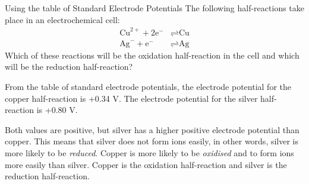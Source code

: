 \begin{wex}{Using the table of Standard Electrode Potentials}
{The following half-reactions take place in an electrochemical cell:
  \begin{align*}
    \text{Cu}^{2+} + 2\text{e}^{-} &\rightleftharpoons \text{Cu} \\
    \text{Ag}^{-} + \text{e}^{-} &\rightleftharpoons \text{Ag}
  \end{align*}
  Which of these reactions will be the oxidation half-reaction in the
  cell and which will be the reduction half-reaction?
}
{
From the table of standard electrode potentials, the electrode potential for the copper half-reaction is +0.34 V. The electrode potential for the silver half-reaction is +0.80 V.

Both values are positive, but silver has a higher positive electrode potential than copper. This means that silver does not form ions easily, in other words, silver is more likely to be \textit{reduced}. Copper is more likely to be \textit{oxidised} and to form ions more easily than silver. Copper is the oxidation half-reaction and silver is the reduction half-reaction.
}
\end{wex}


